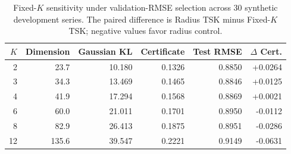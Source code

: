 \begin{table}[htbp]
\caption{Fixed-$K$ sensitivity under validation-RMSE selection across 30 synthetic development series. The paired difference is Radius TSK minus Fixed-$K$ TSK; negative values favor radius control.}
\label{tab:fixed_k_sensitivity}
\centering
\footnotesize
\begin{tabular}{rrrrrr}
\toprule
$K$ & Dimension & Gaussian KL & Certificate & Test RMSE & $\Delta$ Cert. \\
\midrule
2 & 23.7 & 10.180 & 0.1326 & 0.8850 & +0.0264 \\
3 & 34.3 & 13.469 & 0.1465 & 0.8846 & +0.0125 \\
4 & 41.9 & 17.294 & 0.1568 & 0.8869 & +0.0021 \\
6 & 60.0 & 21.011 & 0.1701 & 0.8950 & -0.0112 \\
8 & 82.9 & 26.413 & 0.1875 & 0.8951 & -0.0286 \\
12 & 135.6 & 39.547 & 0.2221 & 0.9149 & -0.0631 \\
\bottomrule
\end{tabular}
\end{table}
